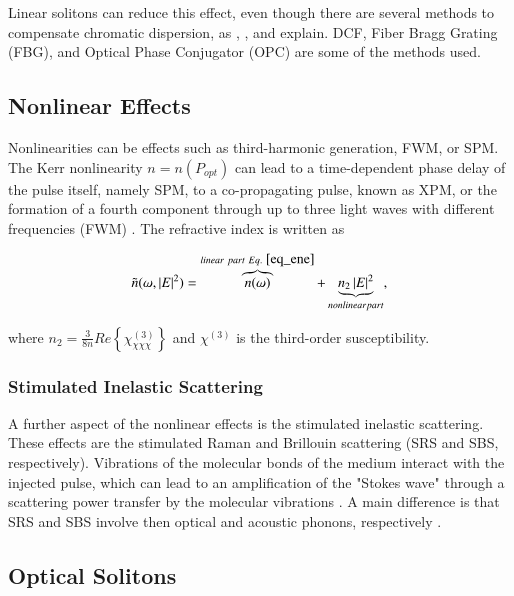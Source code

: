         Linear solitons can reduce this effect, even though there are several methods to compensate chromatic dispersion, as \cite{AgrawalBook}, \cite{dudley_taylor_2010},  and \citep{Udayakumar2013ChromaticDC} explain.
        \gls{DCF}, Fiber Bragg Grating (FBG), and Optical Phase Conjugator (OPC) are some of the methods used.
        
       

    \subsection{Nonlinear Effects}

        Nonlinearities can be effects such as third-harmonic generation, \gls{FWM}, or \gls{SPM}. The Kerr nonlinearity $n = n(P_{opt})$
        can lead to a time-dependent phase delay of the pulse itself, namely \gls{SPM}, to a co-propagating pulse, known as \gls{XPM}, or the formation of a fourth component through up to three light waves with different frequencies (\Gls{FWM}) \cite{rein}. The refractive index is written as
        
        
        \begin{equation}
            \tilde{n} (\omega, \left| E \right|^2) = \overbrace{n(\omega)}^{linear \ part \ Eq. \ \eqref{eq_ene}} + \underbrace{ n_2 \left| E \right|^2}_{nonlinear part},
        \end{equation} 
       
       where $n_2 = \frac{3}{8n}Re\left\{ \chi^{(3)}_{\chi \chi \chi}\right\}$ and $\chi^{(3)}$ is the third-order susceptibility.
   
   \subsubsection{Stimulated Inelastic Scattering}
        A further aspect of the nonlinear effects is the stimulated inelastic scattering. These effects are the stimulated Raman and Brillouin scattering (SRS and SBS, respectively). Vibrations of the molecular bonds of the medium interact with the injected pulse, which can lead to an amplification of the "Stokes wave" through a scattering power transfer by the molecular vibrations \cite{rein}. A main difference is that SRS and SBS involve then optical and acoustic phonons, respectively \cite{AgrawalBook}.
        
    \subsection{Optical Solitons}
    
